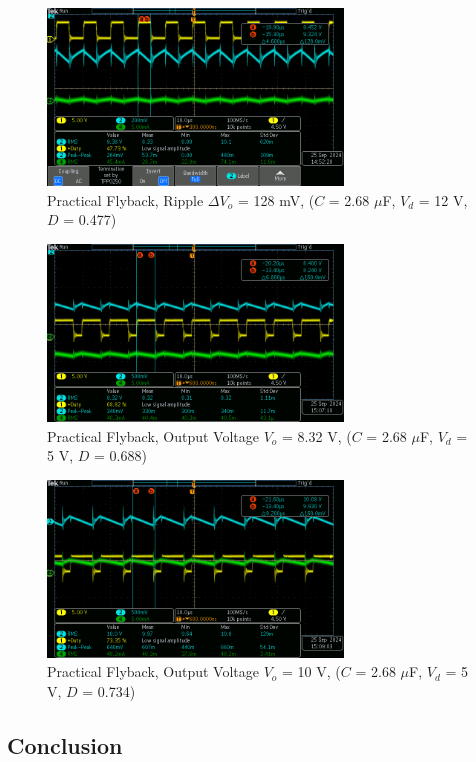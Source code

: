 \documentclass[12pt,twoside]{scrartcl}
\begin{document}
\begin{figure}[htp]
    \centering
    \includegraphics[width=0.7\textwidth]{Flyback/tek0002.png}
    \caption{Practical Flyback, Ripple $\Delta V_o$ = 128 mV, ($C$ = 2.68 $\mu$F, $V_d$ = 12 V, $D$ = 0.477)}
    \label{fig:Practical2}
\end{figure}

\begin{figure}[htp]
    \centering
    \includegraphics[width=0.7\textwidth]{Flyback/tek0003.png}
    \caption{Practical Flyback, Output Voltage $V_o$ = 8.32 V, ($C$ = 2.68 $\mu$F, $V_d$ = 5 V, $D$ = 0.688)}
    \label{fig:Practical3}
\end{figure}

\begin{figure}[htp]
    \centering
    \includegraphics[width=0.7\textwidth]{Flyback/tek0004.png}
    \caption{Practical Flyback, Output Voltage $V_o$ = 10 V, ($C$ = 2.68 $\mu$F, $V_d$ = 5 V, $D$ = 0.734)}
    \label{fig:Practical4}
\end{figure}
\newpage
\subsection{Conclusion}

\newpage


\end{document}
